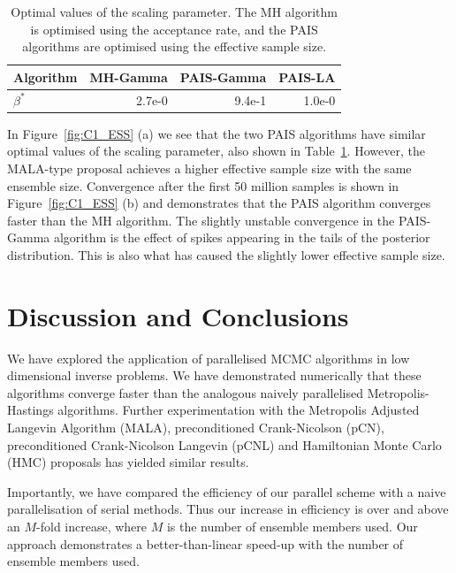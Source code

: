 \documentclass[final]{siamltex}
\begin{document}
\begin{table}[!htb]
      \centering
        \begin{tabular}{|l|r|r|r|}
	\hline
	Algorithm	& MH-Gamma & PAIS-Gamma & PAIS-LA \\ \hline
	$\beta^*$	& 2.7e-0     & 9.4e-1    & 1.0e-0 \\
	\hline
	\end{tabular}
	\vspace{1mm}
	\caption{Optimal values of the scaling parameter. The MH algorithm is optimised using the acceptance rate, and the PAIS algorithms are optimised using the effective sample size.}
	\label{table:C1_opt_beta}
\end{table}

In Figure~\ref{fig:C1_ESS} (a) we see that the two PAIS algorithms have similar optimal values of the scaling parameter, also shown in Table~\ref{table:C1_opt_beta}. However, the MALA-type proposal achieves a higher effective sample size with the same ensemble size. Convergence after the first 50 million samples is shown in Figure~\ref{fig:C1_ESS} (b) and demonstrates that the PAIS algorithm converges faster than the MH algorithm. The slightly unstable convergence in the PAIS-Gamma algorithm is the effect of spikes appearing in the tails of the posterior distribution. This is also what has caused the slightly lower effective sample size.

\section{Discussion and Conclusions}\label{Sec:Conc} 

We have explored the application of parallelised MCMC algorithms in
low dimensional inverse problems. We have demonstrated numerically
that these algorithms converge faster than the analogous naively parallelised
Metropolis-Hastings algorithms. Further experimentation with the Metropolis
Adjusted Langevin Algorithm (MALA), preconditioned Crank-Nicolson (pCN),
preconditioned Crank-Nicolson Langevin (pCNL) and Hamiltonian
Monte Carlo (HMC) proposals has yielded similar results\cite{Paul}.

Importantly, we have compared the efficiency of our parallel scheme
with a naive parallelisation of serial methods. Thus our increase in
efficiency is over and above an $M$-fold increase, where $M$ is the
number of ensemble members used. Our approach
demonstrates a better-than-linear speed-up with the number of ensemble
members used. 
\end{document}
